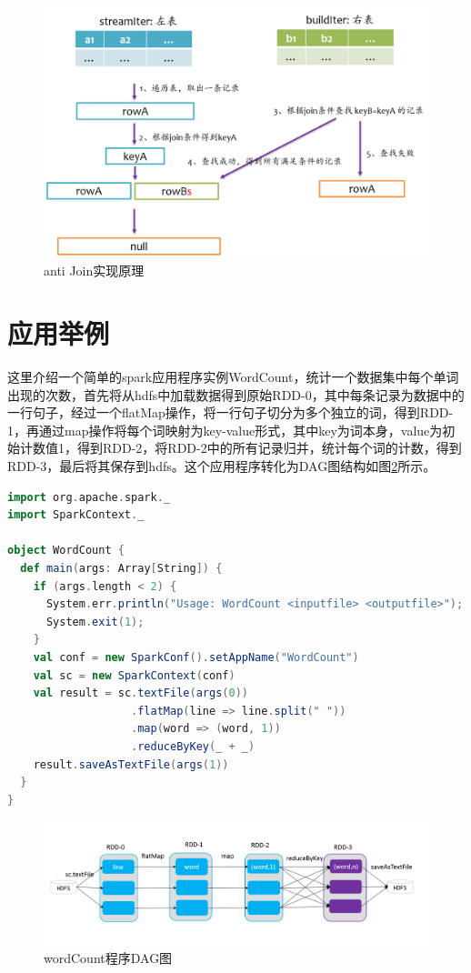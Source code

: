 \begin{figure}[htbp]
    \centering
    \includegraphics[width=1\textwidth]{Img/spark-sql-anti-join.png}
    \caption{anti Join实现原理}
    \label{fig:anti-join}
\end{figure}

\section{应用举例}

这里介绍一个简单的spark应用程序实例WordCount，统计一个数据集中每个单词出现的次数，首先将从hdfs中加载数据得到原始RDD-0，其中每条记录为数据中的一行句子，经过一个flatMap操作，将一行句子切分为多个独立的词，得到RDD-1，再通过map操作将每个词映射为key-value形式，其中key为词本身，value为初始计数值1，得到RDD-2，将RDD-2中的所有记录归并，统计每个词的计数，得到RDD-3，最后将其保存到hdfs。这个应用程序转化为DAG图结构如图\ref{fig:word-count}所示。

\begin{lstlisting}[language=Scala]
import org.apache.spark._
import SparkContext._

object WordCount {
  def main(args: Array[String]) {
    if (args.length < 2) {
      System.err.println("Usage: WordCount <inputfile> <outputfile>");
      System.exit(1);
    }
    val conf = new SparkConf().setAppName("WordCount")
    val sc = new SparkContext(conf)
    val result = sc.textFile(args(0))
                   .flatMap(line => line.split(" "))
                   .map(word => (word, 1))
                   .reduceByKey(_ + _)
    result.saveAsTextFile(args(1))
  }
}
\end{lstlisting}

\begin{figure}[htbp]
    \centering
    \includegraphics[width=1\textwidth]{Img/spark-wordcount.png}
    \caption{wordCount程序DAG图}
    \label{fig:word-count}
\end{figure}

